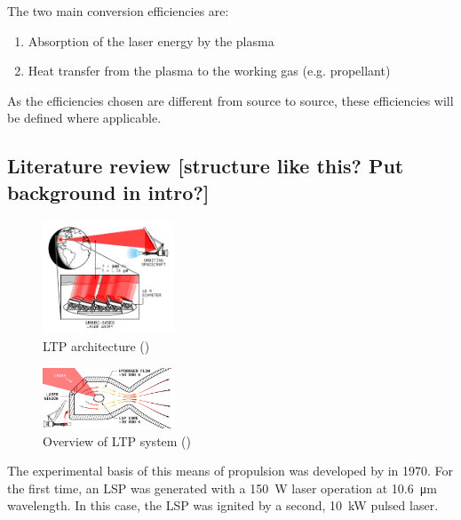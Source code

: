         The two main conversion efficiencies are:
        \begin{enumerate}
            \item Absorption of the laser energy by the plasma
            \item Heat transfer from the plasma to the working gas (e.g. propellant)
        \end{enumerate}

    As the efficiencies chosen are different from source to source, these efficiencies will be defined where applicable.

    \subsection{Literature review [structure like this? Put background in intro?]}
    \begin{figure}[h]
        \centering
        \includegraphics[width=0.35\textwidth]{assets/2 background/ltp_architecture.pdf}
        \caption{LTP architecture (\textcite{duplayArgonLaserPlasmaThruster2024a})}
        \label{fig:LTP architecture}
    \end{figure}

    \begin{figure}[h]
        \centering
        \includegraphics[width=0.35\textwidth]{assets/2 background/chamber.pdf}
        \caption{Overview of LTP system (\textcite{duplayArgonLaserPlasmaThruster2024a})}
        \label{fig:LTP system overview}
    \end{figure}
    

    The experimental basis of this means of propulsion was developed by \textcite{generalovContinuousOpticalDischarge1970} in 1970. For the first time, an LSP was generated with a \qty{150}{W}  laser operation at \qty{10.6}{μm} wavelength. In this case, the LSP was ignited by a second, \qty{10}{kW} pulsed  laser.
    
